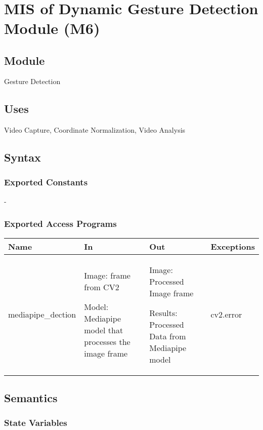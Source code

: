 \documentclass[12pt, titlepage]{article}
\begin{document}
~\newpage
\section{MIS of Dynamic Gesture Detection Module (M6)} \label{M10}

\subsection{Module}

Gesture Detection\\

\subsection{Uses}

Video Capture, Coordinate Normalization, Video Analysis\\

\subsection{Syntax}

\subsubsection{Exported Constants}
-

\subsubsection{Exported Access Programs}
\begin{center}
\begin{tabular}{p{5cm} p{3cm} p{3cm} p{4cm}}
\hline
\textbf{Name} & \textbf{In} & \textbf{Out} & \textbf{Exceptions} \\
\hline
mediapipe_dection & 
Image: frame from CV2

Model: Mediapipe model that processes the image frame
 & Image: Processed Image frame

Results: Processed Data from Mediapipe model
 & cv2.error \\
\hline
\end{tabular}
\end{center}

\subsection{Semantics}

\subsubsection{State Variables}
\end{document}
